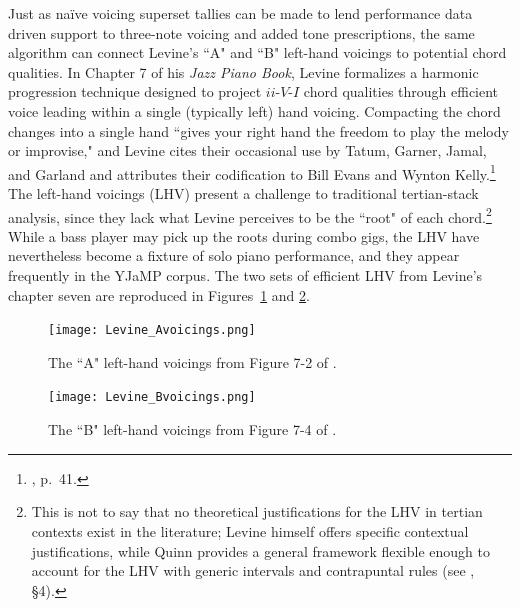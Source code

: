 Just as na\"{i}ve voicing superset tallies can be made to lend performance data driven support to three-note voicing and added tone prescriptions, the same algorithm can connect Levine's ``A" and ``B" left-hand voicings to potential chord qualities.  In Chapter 7 of his \emph{Jazz Piano Book}, Levine formalizes a harmonic progression technique designed to project $ii$-$V$-$I$ chord qualities through efficient voice leading within a single (typically left) hand voicing.  Compacting the chord changes into a single hand ``gives your right hand the freedom to play the melody or improvise," and Levine cites their occasional use by Tatum, Garner, Jamal, and Garland and attributes their codification to Bill Evans and Wynton Kelly.\footnote{\cite{levine1989}, p.\ 41.}  The left-hand voicings (LHV) present a challenge to traditional tertian-stack analysis, since they lack what Levine perceives to be the ``root" of each chord.\footnote{This is not to say that no theoretical justifications for the LHV in tertian contexts exist in the literature; Levine himself offers specific contextual justifications, while Quinn provides a general framework flexible enough to account for the LHV with generic intervals and contrapuntal rules (see \cite{quinn2017}, \S 4).}  While a bass player may pick up the roots during combo gigs, the LHV have nevertheless become a fixture of solo piano performance, and they appear frequently in the YJaMP corpus.  The two sets of efficient LHV from Levine's chapter seven are reproduced in Figures~\ref{levine_Avcg} and \ref{levine_Bvcg}.

\begin{figure}%
	\caption{The ``A" left-hand voicings from Figure 7-2 of \cite{levine1989}.}
	\label{levine_Avcg}
	\centering
	\texttt{[image: Levine\_Avoicings.png]}
\end{figure}
\begin{figure}%
	\caption{The ``B" left-hand voicings from Figure 7-4 of \cite{levine1989}.}
	\label{levine_Bvcg}
	\centering
	\texttt{[image: Levine\_Bvoicings.png]}
\end{figure}

